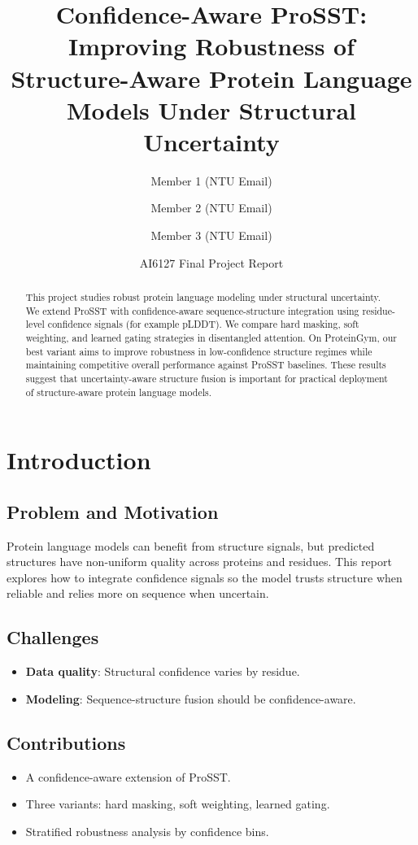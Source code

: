 \documentclass[11pt,a4paper]{article}
\title{Confidence-Aware ProSST: Improving Robustness of Structure-Aware Protein Language Models Under Structural Uncertainty}
\author{
    Member 1 (NTU Email) \and
    Member 2 (NTU Email) \and
    Member 3 (NTU Email)
}
\date{AI6127 Final Project Report}
\begin{document}
\maketitle

\begin{abstract}
This project studies robust protein language modeling under structural uncertainty. We extend ProSST with confidence-aware sequence-structure integration using residue-level confidence signals (for example pLDDT). We compare hard masking, soft weighting, and learned gating strategies in disentangled attention. On ProteinGym, our best variant aims to improve robustness in low-confidence structure regimes while maintaining competitive overall performance against ProSST baselines. These results suggest that uncertainty-aware structure fusion is important for practical deployment of structure-aware protein language models.
\end{abstract}

\section{Introduction}
\subsection{Problem and Motivation}
Protein language models can benefit from structure signals, but predicted structures have non-uniform quality across proteins and residues. This report explores how to integrate confidence signals so the model trusts structure when reliable and relies more on sequence when uncertain.

\subsection{Challenges}
\begin{itemize}[leftmargin=*]
    \item \textbf{Data quality}: Structural confidence varies by residue.
    \item \textbf{Modeling}: Sequence-structure fusion should be confidence-aware.
\end{itemize}

\subsection{Contributions}
\begin{itemize}[leftmargin=*]
    \item A confidence-aware extension of ProSST.
    \item Three variants: hard masking, soft weighting, learned gating.
    \item Stratified robustness analysis by confidence bins.
\end{itemize}
\end{document}
